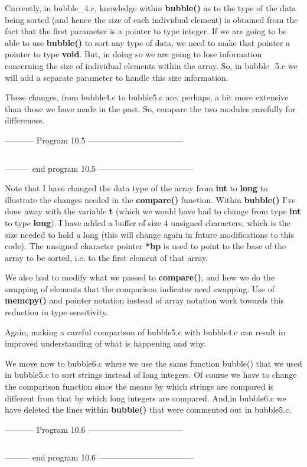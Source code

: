 Currently, in bubble\_4.c, knowledge within \textbf{bubble()} as to the
type of the data being sorted (and hence the size of each individual
element) is obtained from the fact that the first parameter is a pointer
to type integer. If we are going to be able to use \textbf{bubble()} to
sort any type of data, we need to make that pointer a pointer to type
\textbf{void}. But, in doing so we are going to lose information
concerning the size of individual elements within the array. So, in
bubble\_5.c we will add a separate parameter to handle this size
information.

These changes, from bubble4.c to bubble5.c are, perhaps, a bit more
extensive than those we have made in the past. So, compare the two
modules carefully for differences.

-----------  Program 10.5  -----------------------------------
\inputminted[breaklines]{c}{../src/ch10-5.c}
--------- end program 10.5 -----------------------------------

Note that I have changed the data type of the array from \textbf{int} to
\textbf{long} to illustrate the changes needed in the \textbf{compare()}
function. Within \textbf{bubble()} I've done away with the variable
\textbf{t} (which we would have had to change from type \textbf{int} to
type \textbf{long}). I have added a buffer of size 4 unsigned
characters, which is the size needed to hold a long (this will change
again in future modifications to this code). The unsigned character
pointer \textbf{*bp} is used to point to the base of the array to be
sorted, i.e. to the first element of that array.

We also had to modify what we passed to \textbf{compare()}, and how we
do the swapping of elements that the comparison indicates need swapping.
Use of \textbf{memcpy()} and pointer notation instead of array notation
work towards this reduction in type sensitivity.

Again, making a careful comparison of bubble5.c with bubble4.c can
result in improved understanding of what is happening and why.

We move now to bubble6.c where we use the same function bubble() that we
used in bubble5.c to sort strings instead of long integers. Of course we
have to change the comparison function since the means by which strings
are compared is different from that by which long integers are compared.
And,in bubble6.c we have deleted the lines within \textbf{bubble()} that
were commented out in bubble5.c.

-----------  Program 10.6  -----------------------------------
\inputminted[breaklines]{c}{../src/ch10-6.c}
--------- end program 10.6 -----------------------------------

